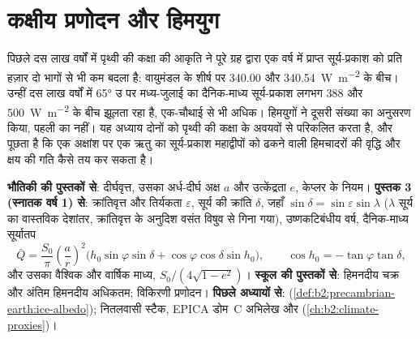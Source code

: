 \chapter{कक्षीय प्रणोदन और हिमयुग}\label{ch:b2:orbital-forcing}

पिछले दस लाख वर्षों में पृथ्वी की कक्षा की आकृति ने पूरे ग्रह द्वारा एक वर्ष में प्राप्त सूर्य-प्रकाश को
प्रति हज़ार दो भागों से भी कम बदला है: वायुमंडल के शीर्ष पर \num{340.00} और
\qty{340.54}{W.m^{-2}} के बीच। उन्हीं दस लाख वर्षों में \ang{65} उ पर मध्य-जुलाई का दैनिक-माध्य
सूर्य-प्रकाश लगभग 388 और \qty{500}{W.m^{-2}} के बीच झूलता रहा है, एक-चौथाई से भी
अधिक। हिमयुगों ने दूसरी संख्या का अनुसरण किया, पहली का नहीं। यह अध्याय दोनों को
पृथ्वी की कक्षा के अवयवों से परिकलित करता है, और पूछता है कि एक अक्षांश पर एक ऋतु का सूर्य-प्रकाश
महाद्वीपों को ढकने वाली हिमचादरों की वृद्धि और क्षय की गति कैसे तय कर सकता है।

\begin{recall}
\textbf{भौतिकी की पुस्तकों से}: दीर्घवृत्त, उसका अर्ध-दीर्घ अक्ष $a$ और उत्केंद्रता $e$, केप्लर के
नियम। \textbf{पुस्तक 3 (स्नातक वर्ष 1) से}: क्रांतिवृत्त और तिर्यकता $\varepsilon$, सूर्य की
क्रांति $\delta$, जहाँ $\sin\delta = \sin\varepsilon\sin\lambda$ ($\lambda$ सूर्य का वास्तविक
देशांतर, क्रांतिवृत्त के अनुदिश वसंत विषुव से गिना गया), उष्णकटिबंधीय वर्ष, दैनिक-माध्य
सूर्यातप
\[
  \bar Q = \frac{S_0}{\pi}\left(\frac{a}{r}\right)^{2}\bigl(h_0\sin\varphi\sin\delta +
  \cos\varphi\cos\delta\sin h_0\bigr),\qquad \cos h_0 = -\tan\varphi\tan\delta ,
\]
और उसका वैश्विक और वार्षिक माध्य, $S_0/(4\sqrt{1 - e^2})$। \textbf{स्कूल की पुस्तकों से}:
हिमनदीय चक्र और अंतिम हिमनदीय अधिकतम; विकिरणी प्रणोदन। \textbf{पिछले अध्यायों से}:
 (\cref{def:b2:precambrian-earth:ice-albedo}); नितलवासी स्टैक, EPICA
डोम~C अभिलेख और  (\cref{ch:b2:climate-proxies})।
\end{recall}

